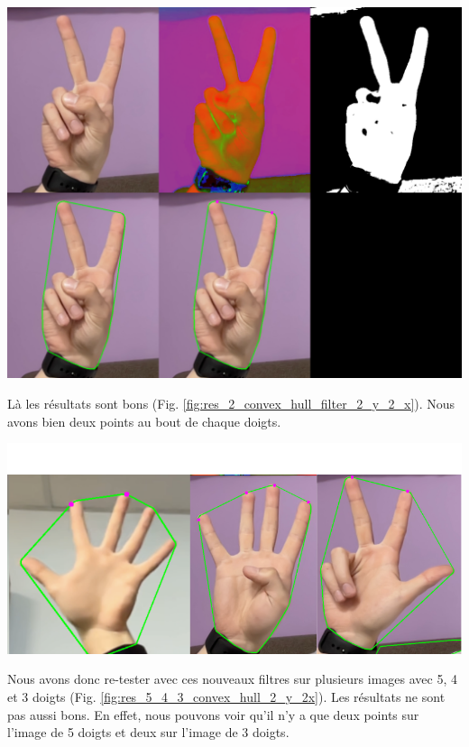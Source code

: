 \documentclass[11pt]{article}
\begin{document}
\begin{center}
    \includegraphics[width=\textwidth]{images/res_2_convex_hull_filter_2_y_2_x.png}
    \label{fig:res_2_convex_hull_filter_2_y_2_x}
\end{center}

Là les résultats sont bons (Fig. \ref{fig:res_2_convex_hull_filter_2_y_2_x}). Nous avons bien deux points au bout de chaque doigts. \bigbreak

\begin{center}
    \includegraphics[width=\textwidth]{images/res_5_4_3_convex_hull_2_y_2x.png}
    \label{fig:res_5_4_3_convex_hull_2_y_2x}
\end{center}

Nous avons donc re-tester avec ces nouveaux filtres sur plusieurs images avec 5, 4 et 3 doigts (Fig. \ref{fig:res_5_4_3_convex_hull_2_y_2x}). Les résultats ne sont pas aussi bons. En effet, nous pouvons voir qu'il n'y a que deux points sur l'image de 5 doigts et deux sur l'image de 3 doigts. \bigbreak
\end{document}
